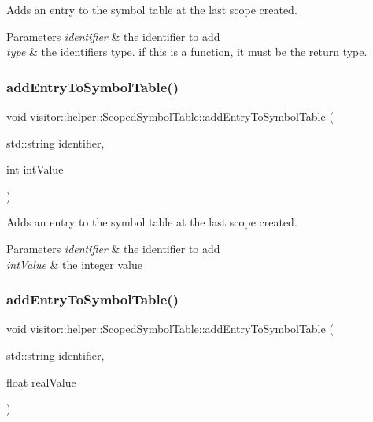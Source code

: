 Adds an entry to the symbol table at the last scope created. 
\begin{DoxyParams}{Parameters}
{\em identifier} & the identifier to add \\
\hline
{\em type} & the identifier\textquotesingle{}s type. if this is a function, it must be the return type. \\
\hline
\end{DoxyParams}
\mbox{\label{classvisitor_1_1helper_1_1ScopedSymbolTable_afc5afd4fe70ae4556e512db38c9c257b}} 
\subsubsection{\texorpdfstring{add\+Entry\+To\+Symbol\+Table()}{addEntryToSymbolTable()}\hspace{0.1cm}{\footnotesize\ttfamily [2/7]}}
{\footnotesize\ttfamily void visitor\+::helper\+::\+Scoped\+Symbol\+Table\+::add\+Entry\+To\+Symbol\+Table (\begin{DoxyParamCaption}\item[{std\+::string}]{identifier,  }\item[{int}]{int\+Value }\end{DoxyParamCaption})}

Adds an entry to the symbol table at the last scope created. 
\begin{DoxyParams}{Parameters}
{\em identifier} & the identifier to add \\
\hline
{\em int\+Value} & the integer value \\
\hline
\end{DoxyParams}
\mbox{\label{classvisitor_1_1helper_1_1ScopedSymbolTable_a8297b38007e89b53bb8286b7afd23d37}} 
\subsubsection{\texorpdfstring{add\+Entry\+To\+Symbol\+Table()}{addEntryToSymbolTable()}\hspace{0.1cm}{\footnotesize\ttfamily [3/7]}}
{\footnotesize\ttfamily void visitor\+::helper\+::\+Scoped\+Symbol\+Table\+::add\+Entry\+To\+Symbol\+Table (\begin{DoxyParamCaption}\item[{std\+::string}]{identifier,  }\item[{float}]{real\+Value }\end{DoxyParamCaption})}

